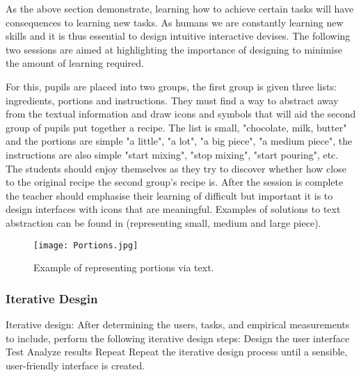 \documentclass{sig-alternate}
\begin{document}
As the above section demonstrate, learning how to achieve certain tasks will have consequences to learning new tasks. As humans we are constantly learning new skills and it is thus essential to design intuitive interactive devises. The following two sessions are aimed at highlighting the importance of designing to minimise the amount of learning required.

For this, pupils are placed into two groups, the first group is given three lists: ingredients, portions and instructions. They must find a way to abstract away from the textual information and draw icons and symbols that will aid the second group of pupils put together a recipe. The list is small, "chocolate, milk, butter" and the portions are simple "a little", "a lot", "a big piece", "a medium piece", the instructions are also simple "start mixing", "stop mixing", "start pouring", etc. The students should enjoy themselves as they try to discover whether how close to the original recipe the second group's recipe is. After the session is complete the teacher should emphasise their learning of difficult but important it is to design interfaces with icons that are meaningful. Examples of solutions to text abstraction can be found in \cite{fig1} (representing small, medium and large piece).


\begin{figure}
  \texttt{[image: Portions.jpg]}
  \caption{Example of representing portions via text.}\label{fig1}
\end{figure}

\subsubsection*{Iterative Desgin}
Iterative design: After determining the users, tasks, and empirical measurements to include, perform the following iterative design steps:
Design the user interface
Test
Analyze results
Repeat
Repeat the iterative design process until a sensible, user-friendly interface is created.
\end{document}
